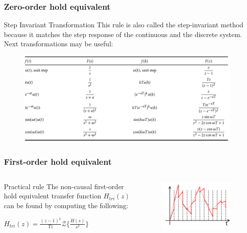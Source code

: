 \begin{frame}
	\frametitle{Zero-order hold equivalent}
	\begin{block}{Step Invariant Transformation}
		This rule is also called the step-invariant method because it matches the step response of the continuous and the discrete system. Next transformations may be useful:
		\vspace{-1em}
		\begin{figure}
			\centering
			\includegraphics[width=0.85\linewidth]{step_inv}
		\end{figure}
	\end{block}
\end{frame}

\begin{frame}
	\frametitle{First-order hold equivalent}
\begin{columns}
	\begin{column}{0.5\textwidth}
	\begin{block}{Practical rule}
		The non-causal first-order hold equivalent transfer function $H_{tri}(z)$ can be found by computing the following:
		\begin{center}
			$H_{tri}(z) = \frac{(z-1)^{2}}{Tz} \mathcal{Z}\{\frac{H(s)}{s^{2}}\}$
		\end{center}
	\end{block}
	\end{column}
	
	\begin{column}{0.5\textwidth}
		\begin{figure}
			\centering
			\includegraphics[width=1\linewidth]{first-order}
		\end{figure}
	\end{column}
\end{columns}
\end{frame}

